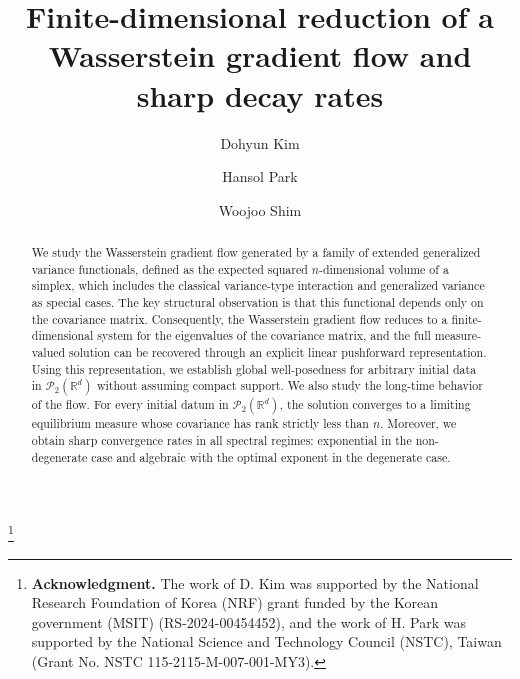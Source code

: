 \documentclass[11pt,reqno]{amsart}
\numberwithin{figure}{section}
\begin{document}
\title[]{Finite-dimensional reduction of a Wasserstein gradient flow and sharp decay rates} 

 
 

\author[D. Kim]{Dohyun Kim}
\address[D. Kim]{\newline Department of Mathematics Education and Institute of Pure and Applied Mathematics, \newline Sungkyunkwan University, Seoul 03063, Republic of Korea}


\author[H. Park]{Hansol Park}
\address[H. Park]{\newline Department of Mathematics, \newline National Tsing Hua University, Hsinchu 30013, Taiwan}


\author[W. Shim]{Woojoo Shim}
\address[W. Shim]{\newline Department of Mathematics Education, \newline Kyungpook National University, Daegu 41566, Republic of Korea }



\thanks{\textbf{Acknowledgment.}
The work of D. Kim was supported by the National Research Foundation of Korea (NRF) grant funded by the Korean government (MSIT) (RS-2024-00454452), and the work of H. Park was supported by the National Science and Technology Council (NSTC), Taiwan (Grant No. NSTC 115-2115-M-007-001-MY3).}

\begin{abstract}
We study the Wasserstein gradient flow generated by a family of extended generalized variance functionals, defined as the expected squared $n$-dimensional volume of a simplex, which includes the classical variance-type interaction and generalized variance as special cases. The key structural observation is that this functional depends only on the covariance matrix. Consequently, the Wasserstein gradient flow reduces to a finite-dimensional system for the eigenvalues of the covariance matrix, and the full measure-valued solution can be recovered through an explicit linear pushforward representation. Using this representation, we establish global well-posedness for arbitrary initial data in $\mathcal P_2(\mathbb R^d)$ without assuming compact support. We also study the long-time behavior of the flow. For every initial datum in $\mathcal P_2(\mathbb R^d)$, the solution converges to a limiting equilibrium measure whose covariance has rank strictly less than $n$. Moreover, we obtain sharp convergence rates in all spectral regimes: exponential in the non-degenerate case and algebraic with the optimal exponent in the degenerate case.
\end{abstract}
\end{document}
